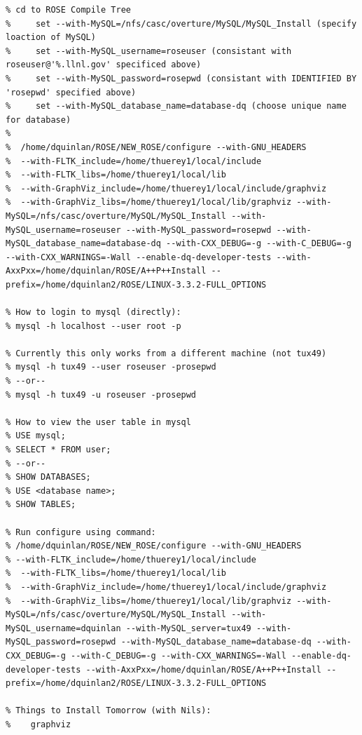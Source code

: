 {\begin{verbatim}
% cd to ROSE Compile Tree
%     set --with-MySQL=/nfs/casc/overture/MySQL/MySQL_Install (specify loaction of MySQL)
%     set --with-MySQL_username=roseuser (consistant with roseuser@'%.llnl.gov' specificed above)
%     set --with-MySQL_password=rosepwd (consistant with IDENTIFIED BY 'rosepwd' specified above)
%     set --with-MySQL_database_name=database-dq (choose unique name for database)
%
%  /home/dquinlan/ROSE/NEW_ROSE/configure --with-GNU_HEADERS
%  --with-FLTK_include=/home/thuerey1/local/include
%  --with-FLTK_libs=/home/thuerey1/local/lib
%  --with-GraphViz_include=/home/thuerey1/local/include/graphviz
%  --with-GraphViz_libs=/home/thuerey1/local/lib/graphviz --with-MySQL=/nfs/casc/overture/MySQL/MySQL_Install --with-MySQL_username=roseuser --with-MySQL_password=rosepwd --with-MySQL_database_name=database-dq --with-CXX_DEBUG=-g --with-C_DEBUG=-g --with-CXX_WARNINGS=-Wall --enable-dq-developer-tests --with-AxxPxx=/home/dquinlan/ROSE/A++P++Install --prefix=/home/dquinlan2/ROSE/LINUX-3.3.2-FULL_OPTIONS

% How to login to mysql (directly):
% mysql -h localhost --user root -p

% Currently this only works from a different machine (not tux49)
% mysql -h tux49 --user roseuser -prosepwd
% --or--
% mysql -h tux49 -u roseuser -prosepwd

% How to view the user table in mysql
% USE mysql;
% SELECT * FROM user;
% --or--
% SHOW DATABASES;
% USE <database name>;
% SHOW TABLES;

% Run configure using command:
% /home/dquinlan/ROSE/NEW_ROSE/configure --with-GNU_HEADERS
% --with-FLTK_include=/home/thuerey1/local/include
%  --with-FLTK_libs=/home/thuerey1/local/lib
%  --with-GraphViz_include=/home/thuerey1/local/include/graphviz
%  --with-GraphViz_libs=/home/thuerey1/local/lib/graphviz --with-MySQL=/nfs/casc/overture/MySQL/MySQL_Install --with-MySQL_username=dquinlan --with-MySQL_server=tux49 --with-MySQL_password=rosepwd --with-MySQL_database_name=database-dq --with-CXX_DEBUG=-g --with-C_DEBUG=-g --with-CXX_WARNINGS=-Wall --enable-dq-developer-tests --with-AxxPxx=/home/dquinlan/ROSE/A++P++Install --prefix=/home/dquinlan2/ROSE/LINUX-3.3.2-FULL_OPTIONS

% Things to Install Tomorrow (with Nils):
%    graphviz

\end{verbatim}
} %

